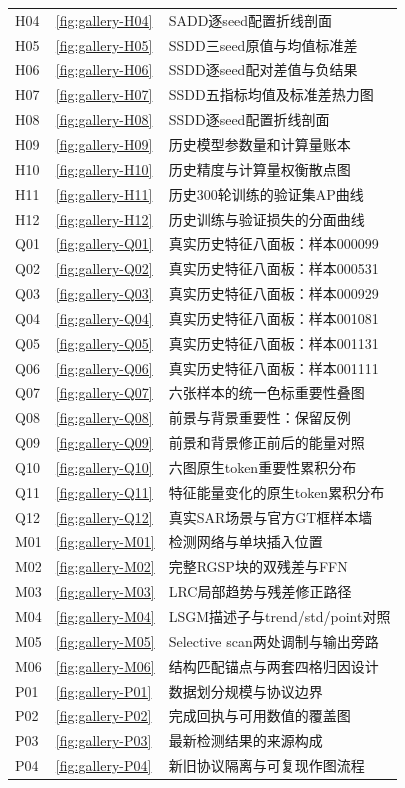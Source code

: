 \documentclass[journal]{IEEEtran}
\begin{document}
\begin{longtable}{@{}p{}p{}p{}@{}}
H04 & \ref{fig:gallery-H04} & SADD逐seed配置折线剖面 \\
H05 & \ref{fig:gallery-H05} & SSDD三seed原值与均值标准差 \\
H06 & \ref{fig:gallery-H06} & SSDD逐seed配对差值与负结果 \\
H07 & \ref{fig:gallery-H07} & SSDD五指标均值及标准差热力图 \\
H08 & \ref{fig:gallery-H08} & SSDD逐seed配置折线剖面 \\
H09 & \ref{fig:gallery-H09} & 历史模型参数量和计算量账本 \\
H10 & \ref{fig:gallery-H10} & 历史精度与计算量权衡散点图 \\
H11 & \ref{fig:gallery-H11} & 历史300轮训练的验证集AP曲线 \\
H12 & \ref{fig:gallery-H12} & 历史训练与验证损失的分面曲线 \\
Q01 & \ref{fig:gallery-Q01} & 真实历史特征八面板：样本000099 \\
Q02 & \ref{fig:gallery-Q02} & 真实历史特征八面板：样本000531 \\
Q03 & \ref{fig:gallery-Q03} & 真实历史特征八面板：样本000929 \\
Q04 & \ref{fig:gallery-Q04} & 真实历史特征八面板：样本001081 \\
Q05 & \ref{fig:gallery-Q05} & 真实历史特征八面板：样本001131 \\
Q06 & \ref{fig:gallery-Q06} & 真实历史特征八面板：样本001111 \\
Q07 & \ref{fig:gallery-Q07} & 六张样本的统一色标重要性叠图 \\
Q08 & \ref{fig:gallery-Q08} & 前景与背景重要性：保留反例 \\
Q09 & \ref{fig:gallery-Q09} & 前景和背景修正前后的能量对照 \\
Q10 & \ref{fig:gallery-Q10} & 六图原生token重要性累积分布 \\
Q11 & \ref{fig:gallery-Q11} & 特征能量变化的原生token累积分布 \\
Q12 & \ref{fig:gallery-Q12} & 真实SAR场景与官方GT框样本墙 \\
M01 & \ref{fig:gallery-M01} & 检测网络与单块插入位置 \\
M02 & \ref{fig:gallery-M02} & 完整RGSP块的双残差与FFN \\
M03 & \ref{fig:gallery-M03} & LRC局部趋势与残差修正路径 \\
M04 & \ref{fig:gallery-M04} & LSGM描述子与trend/std/point对照 \\
M05 & \ref{fig:gallery-M05} & Selective scan两处调制与输出旁路 \\
M06 & \ref{fig:gallery-M06} & 结构匹配锚点与两套四格归因设计 \\
P01 & \ref{fig:gallery-P01} & 数据划分规模与协议边界 \\
P02 & \ref{fig:gallery-P02} & 完成回执与可用数值的覆盖图 \\
P03 & \ref{fig:gallery-P03} & 最新检测结果的来源构成 \\
P04 & \ref{fig:gallery-P04} & 新旧协议隔离与可复现作图流程 \\
\end{longtable}
\normalsize
\end{document}
